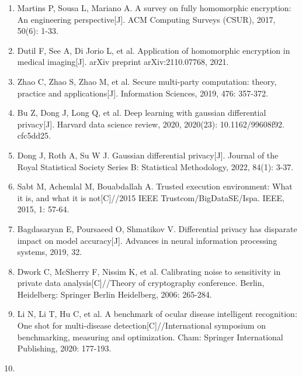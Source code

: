 \begin{enumerate}
  \protect{}\label{_Ref213950391}{}Li T, Sahu A K, Zaheer M, et al. Federated optimization in heterogeneous networks{[}J{]}. Proceedings of Machine learning and systems, 2020, 2: 429-450.
\item
  \protect{}\label{_Ref213950427}{}Martins P, Sousa L, Mariano A. A survey on fully homomorphic encryption: An engineering perspective{[}J{]}. ACM Computing Surveys (CSUR), 2017, 50(6): 1-33.
\item
  \protect{}\label{_Ref213950433}{}Dutil F, See A, Di Jorio L, et al. Application of homomorphic encryption in medical imaging{[}J{]}. arXiv preprint arXiv:2110.07768, 2021.
\item
  \protect{}\label{_Ref213950438}{}Zhao C, Zhao S, Zhao M, et al. Secure multi-party computation: theory, practice and applications{[}J{]}. Information Sciences, 2019, 476: 357-372.
\item
  \protect{}\label{_Ref213950443}{}Bu Z, Dong J, Long Q, et al. Deep learning with gaussian differential privacy{[}J{]}. Harvard data science review, 2020, 2020(23): 10.1162/99608f92. cfc5dd25.
\item
  \protect{}\label{_Ref213950449}{}Dong J, Roth A, Su W J. Gaussian differential privacy{[}J{]}. Journal of the Royal Statistical Society Series B: Statistical Methodology, 2022, 84(1): 3-37.
\item
  \protect{}\label{_Ref213950453}{}Sabt M, Achemlal M, Bouabdallah A. Trusted execution environment: What it is, and what it is not{[}C{]}//2015 IEEE Trustcom/BigDataSE/Ispa. IEEE, 2015, 1: 57-64.
\item
  \protect{}\label{_Ref213950458}{}Bagdasaryan E, Poursaeed O, Shmatikov V. Differential privacy has disparate impact on model accuracy{[}J{]}. Advances in neural information processing systems, 2019, 32.
\item
  \protect{}\label{_Ref214903493}{}Dwork C, McSherry F, Nissim K, et al. Calibrating noise to sensitivity in private data analysis{[}C{]}//Theory of cryptography conference. Berlin, Heidelberg: Springer Berlin Heidelberg, 2006: 265-284.
\item
  \protect{}\label{_Ref213949402}{}Li N, Li T, Hu C, et al. A benchmark of ocular disease intelligent recognition: One shot for multi-disease detection{[}C{]}//International symposium on benchmarking, measuring and optimization. Cham: Springer International Publishing, 2020: 177-193.
\item

\end{enumerate}
